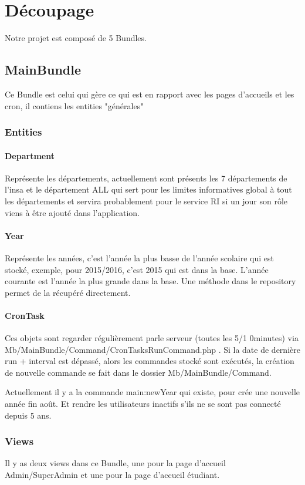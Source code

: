 \chapter{Découpage}
Notre projet est composé de 5 Bundles.

\section{MainBundle}
Ce Bundle est celui qui gère ce qui est en rapport avec les pages d'accueils et les cron, il contiens les entities "générales"

\subsection{Entities}
\subsubsection{Department}
Représente les départements, actuellement sont présents les 7 départements de l'insa et le département ALL qui sert pour les limites informatives global à tout les départements et servira probablement pour le service RI si un jour son rôle viens à être ajouté dans l'application.

\subsubsection{Year}
Représente les années, c'est l'année la plus basse de l'année scolaire qui est stocké, exemple, pour 2015/2016, c'est 2015 qui est dans la base. L'année courante est l'année la plus grande dans la base. Une méthode dans le repository permet de la récupéré directement.

\subsubsection{CronTask}
Ces objets sont regarder régulièrement parle serveur (toutes les 5/1 0minutes) via Mb/MainBundle/Command/CronTasksRunCommand.php . 
Si la date de dernière run + interval est dépassé, alors les commandes stocké sont exécutés, la création de nouvelle commande se fait dans le dossier Mb/MainBundle/Command. 

Actuellement il y a la commande main:newYear qui existe, pour crée une nouvelle année fin août. Et rendre les utilisateurs inactifs s'ils ne se sont pas connecté depuis 5 ans.


\subsection{Views}
Il y as deux views dans ce Bundle, une pour la page d'accueil Admin/SuperAdmin et une pour la page d'accueil étudiant.

